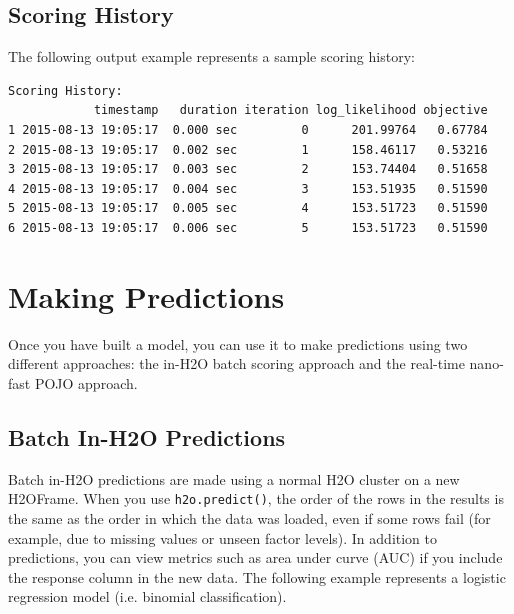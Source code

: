 \newpage
\waterExampleInPython


\subsection{Scoring History}

The following output example represents a sample scoring history: 


\waterExampleInPython

\begin{lstlisting}[style=output]
Scoring History:
            timestamp   duration iteration log_likelihood objective
1 2015-08-13 19:05:17  0.000 sec         0      201.99764   0.67784
2 2015-08-13 19:05:17  0.002 sec         1      158.46117   0.53216
3 2015-08-13 19:05:17  0.003 sec         2      153.74404   0.51658
4 2015-08-13 19:05:17  0.004 sec         3      153.51935   0.51590
5 2015-08-13 19:05:17  0.005 sec         4      153.51723   0.51590
6 2015-08-13 19:05:17  0.006 sec         5      153.51723   0.51590
\end{lstlisting}




\section{Making Predictions}

Once you have built a model, you can use it to make predictions using two different approaches:  the in-H2O batch scoring approach and the real-time nano-fast POJO approach.

\subsection{Batch In-H2O Predictions}

Batch in-H2O predictions are made using a normal H2O cluster on a new H2OFrame.  When you use \texttt{h2o.predict()}, the order of the rows in the results is the same as the order in which the data was loaded, even if some rows fail (for example, due to missing values or unseen factor levels). 
In addition to predictions, you can view metrics such as area under curve (AUC) if you include the response column in the new data.  The following example represents a logistic regression model (i.e. binomial classification).

